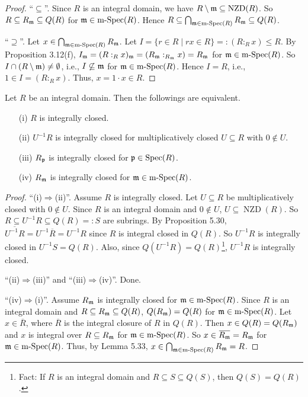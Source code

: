 \begin{proof}
    ``$\subseteq$''. Since $R$ is an integral domain, we have $R \setminus \mathfrak{m} \subseteq \operatorname{NZD}(R)$. So $R \subseteq R_{\mathfrak{m}} \subseteq Q(R)$ for $\mathfrak{m} \in \operatorname{m-Spec}(R)$. Hence $R \subseteq \bigcap_{\mathfrak{m} \in \operatorname{m-Spec}(R)}R_{\mathfrak{m}} \subseteq Q(R)$. \par 
    ``$\supseteq$''. Let $x \in \bigcap_{\mathfrak{m} \in \operatorname{m-Spec}(R)}R_{\mathfrak{m}}$. Let $I = \{r \in R \mid rx \in R\} =: (R:_Rx) \leq R$. By Proposition 3.12(f), $I_{\mathfrak{m}} = (R:_Rx)_{\mathfrak{m}} = (R_{\mathfrak{m}}:_{R_{\mathfrak{m}}}x) = R_{\mathfrak{m}}$ for $\mathfrak{m} \in \operatorname{m-Spec}(R)$. So $I \cap (R \setminus \mathfrak{m}) \neq \emptyset$, i.e., $I \not\subseteq \mathfrak{m}$ for $\mathfrak{m} \in \operatorname{m-Spec}(R)$. Hence $I = R$, i.e., $1 \in I = (R:_Rx)$. Thus, $x = 1 \cdot x \in R$. 
\end{proof}

\begin{proposition}
    Let $R$ be an integral domain. Then the followings are equivalent.
    \begin{enumerate}
        \item[(i)] $R$ is integrally closed.
        \item[(ii)] $U^{-1}R$ is integrally closed for multiplicatively closed $U \subseteq R$ with $0 \not \in U$.
        \item[(iii)] $R_{\mathfrak{p}}$ is integrally closed for $\mathfrak{p} \in \operatorname{Spec}(R)$.
        \item[(iv)] $R_{\mathfrak{m}}$ is integrally closed for $\mathfrak{m} \in \operatorname{m-Spec}(R)$.
    \end{enumerate}
\end{proposition}

\begin{proof}
    ``(i)$\Rightarrow$(ii)''. Assume $R$ is integrally closed. Let $U \subseteq R$ be multiplicatively closed with $0 \not \in U$. Since $R$ is an integral domain and $0 \not\in U$, $U \subseteq \operatorname{NZD}(R)$. So $R \subseteq U^{-1}R \subseteq Q(R) =: S$ are subrings. By Proposition 5.30, $\overbar{U^{-1}R} = U^{-1} \overbar{R} = U^{-1}R$ since $R$ is integral closed in $Q(R)$. So $U^{-1}R$ is integrally closed in $U^{-1}S = Q(R)$. Also, since $Q(U^{-1}R) = Q(R)$\footnote[2]{Fact: If $R$ is an integral domain and $R \subseteq S \subseteq Q(S)$, then $Q(S) = Q(R)$.}, $U^{-1}R$ is integrally closed. \par 
    ``(ii)$\Rightarrow$(iii)'' and ``(iii)$\Rightarrow$(iv)''. Done. \par
    ``(iv)$\Rightarrow$(i)''. Assume $R_{\mathfrak{m}}$ is integrally closed for $\mathfrak{m} \in \operatorname{m-Spec}(R)$. Since $R$ is an integral domain and $R \subseteq R_{\mathfrak{m}} \subseteq Q(R)$, $Q(R_{\mathfrak{m}}) = Q(R)$ for $\mathfrak{m} \in \operatorname{m-Spec}(R)$. Let $x \in \overbar{R}$, where $\overbar{R}$ is the integral closure of $R$ in $Q(R)$. Then $x \in Q(R) = Q(R_{\mathfrak{m}})$ and $x$ is integral over $R \subseteq R_{\mathfrak{m}}$ for $\mathfrak{m} \in \operatorname{m-Spec}(R)$. So $x \in \overbar{R_\ffm} = R_\ffm$ for $\mathfrak{m} \in \operatorname{m-Spec}(R)$. Thus, by Lemma 5.33, $x \in \bigcap_{\mathfrak{m} \in \operatorname{m-Spec}(R)}R_{\mathfrak{m}} = R$. 
\end{proof}

